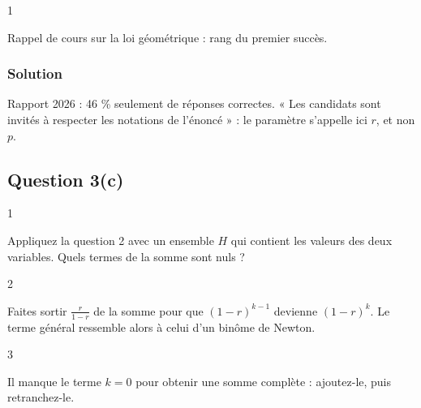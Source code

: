 \documentclass[11pt,a4paper]{article}
\newcommand{\equationajustee}[1]{%
  \sbox{\boiteequation}{$\displaystyle #1$}%
  \ifdim\wd\boiteequation>\linewidth
    \[\resizebox{\linewidth}{!}{\usebox{\boiteequation}}\]%
  \else
    \[#1\]%
  \fi}
\begin{document}
\begin{indication}{1}

Rappel de cours sur la loi géométrique : rang du premier succès.

\end{indication}

\hypertarget{solution-21}{%
\subsubsection{Solution}\label{solution-21}}

\equationajustee{\boxed{\begin{aligned}{}&B(\Omega)={\mathbb{N}}^*,\\
&P(B=k)=r(1-r)^{k-1}\quad(k\geqslant1)
\end{aligned}}}

\begin{jury}

Rapport 2026 : 46 \% seulement de réponses correctes. « Les candidats sont invités à respecter les notations de l'énoncé » : le paramètre s'appelle ici \(r\), et non \(p\).

\end{jury}

\hypertarget{question-3c}{%
\subsection{Question 3(c)}\label{question-3c}}

\begin{indication}{1}

Appliquez la question 2 avec un ensemble \(H\) qui contient les valeurs des deux variables. Quels termes de la somme sont nuls ?

\end{indication}

\begin{indication}{2}

Faites sortir \(\frac{r}{1-r}\) de la somme pour que \((1-r)^{k-1}\) devienne \((1-r)^k\). Le terme général ressemble alors à celui d'un binôme de Newton.

\end{indication}

\begin{indication}{3}

Il manque le terme \(k=0\) pour obtenir une somme complète : ajoutez-le, puis retranchez-le.

\end{indication}
\end{document}
